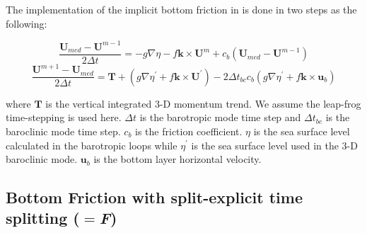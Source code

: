 The implementation of the implicit bottom friction in  is done in two steps as the
following:

\begin{equation} \label{Eq_dynspg_ts_bfr1}
\frac{\textbf{U}_{med}-\textbf{U}^{m-1}}{2\Delta t}=-g\nabla\eta-f\textbf{k}\times\textbf{U}^{m}+c_{b}
\left(\textbf{U}_{med}-\textbf{U}^{m-1}\right)
\end{equation}
\begin{equation} \label{Eq_dynspg_ts_bfr2}
\frac{\textbf{U}^{m+1}-\textbf{U}_{med}}{2\Delta t}=\textbf{T}+
\left(g\nabla\eta^{'}+f\textbf{k}\times\textbf{U}^{'}\right)-
2\Delta t_{bc}c_{b}\left(g\nabla\eta^{'}+f\textbf{k}\times\textbf{u}_{b}\right)
\end{equation}

where $\textbf{T}$ is the vertical integrated 3-D momentum trend. We assume the leap-frog time-stepping
is used here. $\Delta t$ is the barotropic mode time step and $\Delta t_{bc}$ is the baroclinic mode time step.
 $c_{b}$ is the friction coefficient. $\eta$ is the sea surface level calculated in the barotropic loops
while $\eta^{'}$ is the sea surface level used in the 3-D baroclinic mode. $\textbf{u}_{b}$ is the bottom
layer horizontal velocity.




\subsection{Bottom Friction with split-explicit time splitting ($=$\textit{F})}
\label{ZDF_bfr_ts}

